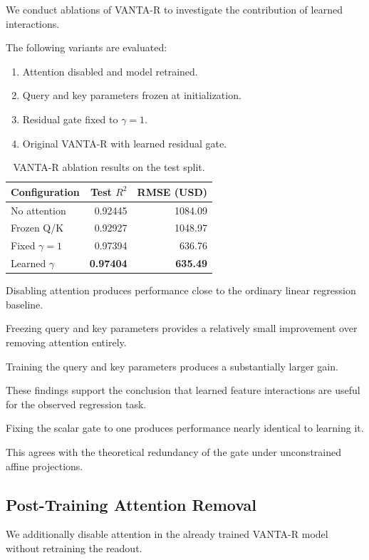 \documentclass[11pt,a4paper]{article}
\begin{document}
We conduct ablations of VANTA-R
to investigate the contribution of
learned interactions.

The following variants are evaluated:

\begin{enumerate}[leftmargin=*]
\item Attention disabled and model retrained.
\item Query and key parameters frozen at initialization.
\item Residual gate fixed to $\gamma=1$.
\item Original VANTA-R with learned residual gate.
\end{enumerate}

\begin{table}[ht]
\centering
\caption{VANTA-R ablation results on the test split.}
\label{tab:ablations}
\begin{tabular}{lrr}
\toprule
Configuration & Test $R^2$ & RMSE (USD)\\
\midrule
No attention & 0.92445 & 1084.09\\
Frozen Q/K & 0.92927 & 1048.97\\
Fixed $\gamma=1$ & 0.97394 & 636.76\\
Learned $\gamma$ & \textbf{0.97404} & \textbf{635.49}\\
\bottomrule
\end{tabular}
\end{table}

Disabling attention produces
performance close to the ordinary
linear regression baseline.

Freezing query and key parameters
provides a relatively small improvement
over removing attention entirely.

Training the query and key parameters
produces a substantially larger gain.

These findings support the conclusion
that learned feature interactions are
useful for the observed regression task.

Fixing the scalar gate to one produces
performance nearly identical to
learning it.

This agrees with the theoretical
redundancy of the gate under
unconstrained affine projections.

\subsection{Post-Training Attention Removal}

We additionally disable attention
in the already trained VANTA-R model
without retraining the readout.
\end{document}
